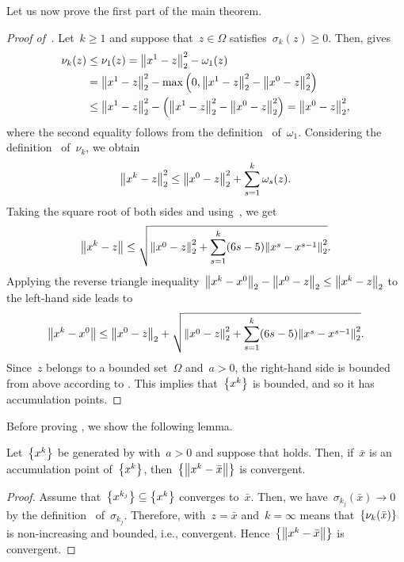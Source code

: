 \documentclass[../main]{subfiles}
\begin{document}
Let us now prove the first part of the main theorem.
\begin{proof}[Proof of~]
    Let~$k \ge 1$ and suppose that~$z \in \Omega$ satisfies~$\sigma_k(z) \ge 0$.
    Then,  gives
    \begin{align}
            \nu_k(z) &\le \nu_1(z) = \norm*{x^1 - z}_2^2 - \omega_1(z) \\
                           &= \norm*{x^1 - z}_2^2 - \max \left( 0, \norm*{x^1 - z}_2^2 - \norm*{x^0 - z}_2^2 \right) \\
                           &\le \norm*{x^1 - z}_2^2 - \left( \norm*{x^1 - z}_2^2 - \norm*{x^0 - z}_2^2 \right) = \norm*{x^0 - z}_2^2
    ,\end{align} 
    where the second equality follows from the definition~ of~$\omega_1$.
    Considering the definition~ of~$\nu_k$, we obtain
    \begin{equation}
        \norm*{x^k - z}_2^2 \le \norm*{x^0 - z}_2^2 + \sum_{s = 1}^{k} \omega_s(z)
    .\end{equation} 
    Taking the square root of both sides and using~, we get
    \begin{equation}
        \norm*{x^k - z} \le \sqrt{ \norm*{x^0 - z}_2^2 + \sum_{s = 1}^{k} (6s - 5) \norm*{x^s - x^{s - 1}}_2^2 }
    .\end{equation} 
    Applying the reverse triangle inequality~$\norm*{x^k - x^0}_2 - \norm*{x^0 - z}_2 \le \norm*{x^k - z}_2$ to the left-hand side leads to
    \begin{equation}
        \norm*{x^k - x^0} \le \norm*{x^0 - z}_2 + \sqrt{ \norm*{x^0 - z}_2^2 + \sum_{s = 1}^{k} (6s - 5) \norm*{x^s - x^{s - 1}}_2^2 }
    .\end{equation}
    Since~$z$ belongs to a bounded set~$\Omega$ and~$a > 0$, the right-hand side is bounded from above according to .
    This implies that~$\set*{x^k}$ is bounded, and so it has accumulation points.
\end{proof}

Before proving , we show the following lemma.
\begin{lemma} 
    Let~$\set*{x^k}$ be generated by  with~$a > 0$ and suppose that  holds.
    Then, if~$\bar{x}$ is an accumulation point of~$\set*{x^k}$, then~$\set*{\norm*{x^k - \bar{x}}}$ is convergent.
\end{lemma}
\begin{proof}
    Assume that~$\set*{x^{k_j}} \subseteq \set*{x^k}$ converges to~$\bar{x}$.
    Then, we have~$\sigma_{k_j}(\bar{x}) \to 0$ by the definition~ of~$\sigma_{k_j}$.
    Therefore,  with~$z = \bar{x}$ and~$k = \infty$ means that~$\set*{\nu_k(\bar{x})}$ is non-increasing and bounded, i.e., convergent.
    Hence~$\set*{\norm*{x^k - \bar{x}}}$ is convergent.
\end{proof}
\end{document}
